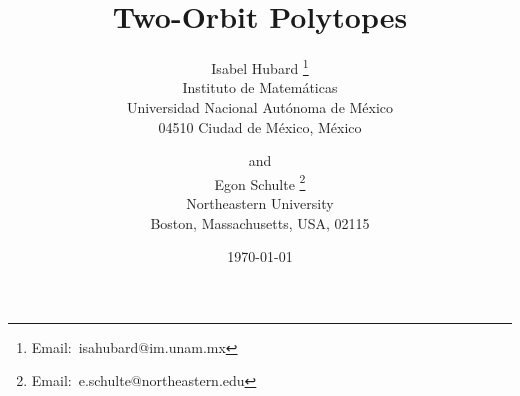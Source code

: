 \documentclass[12pt]{article}
\renewcommand{\>}{\rangle}
\theoremstyle{definition}\newtheorem{definition}{Definition}[section]
\begin{document}

\title{Two-Orbit Polytopes}
 
\author{Isabel Hubard
\thanks{Email:\ isahubard@im.unam.mx%
}\\
Instituto de Matem\'aticas \\
Universidad Nacional Aut\'onoma de M\'exico\\
04510 Ciudad de M\'exico, M\'exico
\and and \\[.05in]
Egon Schulte
\thanks{Email:\ e.schulte@northeastern.edu%
}\\
Northeastern University\\
Boston, Massachusetts,  USA, 02115\bigskip}

\date{ \today } 
\maketitle 
\end{document}
